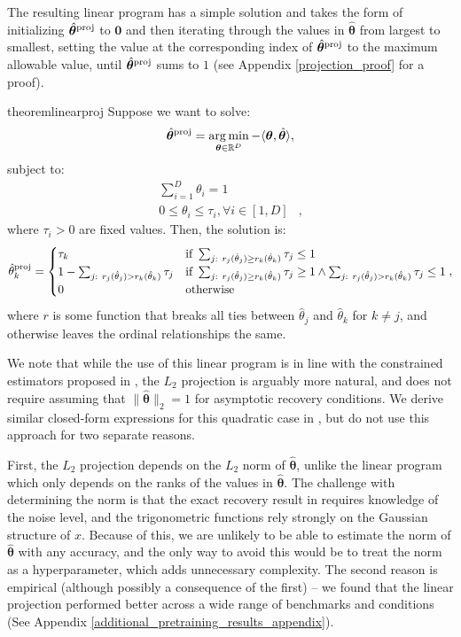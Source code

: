 \documentclass{article} %
\newcommand{\bmthproj}{\hat{\bm{\theta}}^{\textnormal{proj}}}
\begin{document}
The resulting linear program has a simple solution and takes the form of initializing $\bmthproj$ to $\mathbf{0}$ and then iterating through the values in $\hat{\bm{\theta}}$ from largest to smallest, setting the value at the corresponding index of $\bmthproj$ to the maximum allowable value, until $\bmthproj$ sums to $1$ (see Appendix \ref{projection_proof} for a proof).
\begin{restatable}{theorem}{linearproj} 
Suppose we want to solve:
\[
\bmthproj = \argmin_{\bm{\theta}\in\mathbb{R}^D} -\langle \bm{\theta},\hat{\bm{\theta}} \rangle,
\]
subject to:
\begin{align*}
\sum_{i=1}^D \theta_i = 1&\\
0 \leq \theta_i \leq \tau_i, \forall i \in [1,D]&,
\end{align*}
where $\tau_i>0$ are fixed values. Then, the solution is:
\begin{equation}
\label{linear_proj_equation}
  \hat{\theta}^\textnormal{proj}_k = 
  \begin{cases} 
    \tau_k & \text{if } \sum_{j\text{: }r_j(\hat{\theta}_j) \geq r_k(\hat{\theta}_k)} \tau_j \leq 1\\
    1-\sum_{j\text{: }r_j(\hat{\theta}_j) > r_k(\hat{\theta}_k)} \tau_j & \text{if } \sum_{j\text{: }r_j(\hat{\theta}_j) \geq r_k(\hat{\theta}_k)} \tau_j \geq 1 \land \sum_{j\text{: }r_j(\hat{\theta}_j) > r_k(\hat{\theta}_k)} \tau_j \leq 1\\
    0 & \text{otherwise}
  \end{cases},
\end{equation}
where $r$ is some function that breaks all ties between $\hat{\theta}_j$ and $\hat{\theta}_k$ for $k \neq j$, and otherwise leaves the ordinal relationships the same.
\end{restatable}

We note that while the use of this linear program is in line with the constrained estimators proposed in \citet{chen2017robust}, the $L_2$ projection is arguably more natural, and does not require assuming that $\|\hat{\bm{\theta}}\|_2 = 1$ for asymptotic recovery conditions. We derive similar closed-form expressions for this quadratic case in , but do not use this approach for two separate reasons.

First, the $L_2$ projection depends on the $L_2$ norm of $\hat{\bm{\theta}}$, unlike the linear program which only depends on the ranks of the values in $\hat{\bm{\theta}}$. The challenge with determining the norm is that the exact recovery result in  requires knowledge of the noise level, and the trigonometric functions rely strongly on the Gaussian structure of $x$. Because of this, we are unlikely to be able to estimate the norm of $\hat{\bm{\theta}}$ with any accuracy, and the only way to avoid this would be to treat the norm as a hyperparameter, which adds unnecessary complexity. The second reason is empirical (although possibly a consequence of the first) -- we found that the linear projection performed better across a wide range of benchmarks and conditions (See Appendix \ref{additional_pretraining_results_appendix}).
\end{document}
